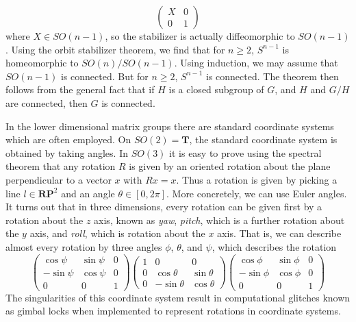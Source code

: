 \begin{example}
    \[ \begin{pmatrix} X & 0 \\ 0 & 1 \end{pmatrix} \]
    where $X \in SO(n-1)$, so the stabilizer is actually diffeomorphic to $SO(n-1)$. Using the orbit stabilizer theorem, we find that for $n \geq 2$, $S^{n-1}$ is homeomorphic to $SO(n)/SO(n-1)$. Using induction, we may assume that $SO(n-1)$ is connected. But for $n \geq 2$, $S^{n-1}$ is connected. The theorem then follows from the general fact that if $H$ is a closed subgroup of $G$, and $H$ and $G/H$ are connected, then $G$ is connected.
\end{example}

\begin{remark}
    In the lower dimensional matrix groups there are standard coordinate systems which are often employed. On $SO(2) = \mathbf{T}$, the standard coordinate system is obtained by taking angles. In $SO(3)$ it is easy to prove using the spectral theorem that any rotation $R$ is given by an oriented rotation about the plane perpendicular to a vector $x$ with $Rx = x$. Thus a rotation is given by picking a line $l \in \mathbf{RP}^2$ and an angle $\theta \in [0,2\pi]$. More concretely, we can use Euler angles. It turns out that in three dimensions, every rotation can be given first by a rotation about the $z$ axis, known as {\it yaw}, {\it pitch}, which is a further rotation about the $y$ axis, and {\it roll}, which is rotation about the $x$ axis. That is, we can describe almost every rotation by three angles $\phi$, $\theta$, and $\psi$, which describes the rotation
    \[ \begin{pmatrix} \cos \psi & \sin \psi & 0 \\ - \sin \psi & \cos \psi & 0 \\ 0 & 0 & 1 \end{pmatrix} \begin{pmatrix} 1 & 0 & 0 \\ 0 & \cos \theta & \sin \theta \\ 0 & - \sin \theta & \cos \theta \end{pmatrix} \begin{pmatrix} \cos \phi & \sin \phi & 0 \\ -\sin \phi & \cos \phi & 0 \\ 0 & 0 & 1 \end{pmatrix} \]
    The singularities of this coordinate system result in computational glitches known as gimbal locks when implemented to represent rotations in coordinate systems.
\end{remark}

